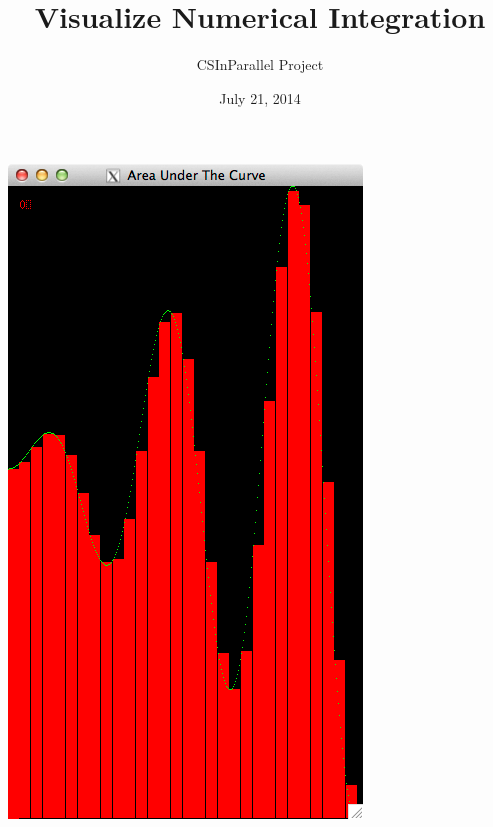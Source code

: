 \documentclass[letterpaper,10pt,openany,oneside]{sphinxmanual}
\title{Visualize Numerical Integration}
\date{July 21, 2014}
\author{CSInParallel Project}
\begin{document}
\maketitle
\tableofcontents
{}\label{index::doc}


\includegraphics{serial_30rect.png}
\end{document}
